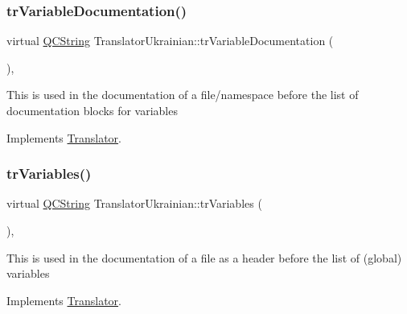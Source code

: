 \mbox{\label{class_translator_ukrainian_a77858ba3dab6529b3848030192b586fd}} 
\subsubsection{\texorpdfstring{trVariableDocumentation()}{trVariableDocumentation()}}
{\footnotesize\ttfamily virtual \mbox{\hyperlink{class_q_c_string}{Q\+C\+String}} Translator\+Ukrainian\+::tr\+Variable\+Documentation (\begin{DoxyParamCaption}{ }\end{DoxyParamCaption})\hspace{0.3cm}{\ttfamily [inline]}, {\ttfamily [virtual]}}

This is used in the documentation of a file/namespace before the list of documentation blocks for variables 

Implements \mbox{\hyperlink{class_translator}{Translator}}.

\mbox{\label{class_translator_ukrainian_a8b7bd5286c40e2c1538771c9883f2db0}} 
\subsubsection{\texorpdfstring{trVariables()}{trVariables()}}
{\footnotesize\ttfamily virtual \mbox{\hyperlink{class_q_c_string}{Q\+C\+String}} Translator\+Ukrainian\+::tr\+Variables (\begin{DoxyParamCaption}{ }\end{DoxyParamCaption})\hspace{0.3cm}{\ttfamily [inline]}, {\ttfamily [virtual]}}

This is used in the documentation of a file as a header before the list of (global) variables 

Implements \mbox{\hyperlink{class_translator}{Translator}}.

\mbox{\label{class_translator_ukrainian_ab3f06a0fac867b03a0ca9c230a2b37e8}} 
